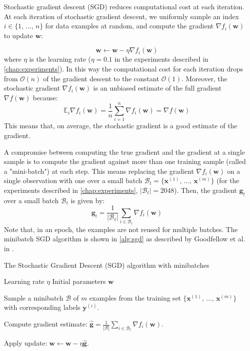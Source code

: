 Stochastic gradient descent (SGD) reduces computational cost at each iteration. At each iteration of stochastic gradient descent, we uniformly sample an index $i \in \{ 1, \, ..., \, n\}$ for data examples at random, and compute the gradient $\nabla f_i (\textbf{w})$ to update $\textbf{w}$:

\begin{equation}
    \textbf{w} \leftarrow \textbf{w} - \eta \nabla f_i(\textbf{w})
\end{equation}
where $\eta$ is the learning rate ($\eta = 0.1$ in the experiments described in \autoref{chap:experiments}). In this way the computational cost for each iteration drops from $\mathcal{O}(n)$ of the gradient descent to the constant $\mathcal{O}(1)$. Moreover, the stochastic gradient $\nabla f_i(\textbf{w})$ is an unbiased estimate of the full gradient $\nabla f(\textbf{w})$ because:
\begin{equation}
    \mathbb{E}_i \nabla f_i(\mathbf{w}) = \frac{1}{n} \sum_{i = 1}^n \nabla f_i(\mathbf{w}) = \nabla f(\mathbf{w})
\end{equation}
This means that, on average, the stochastic gradient is a good estimate of the gradient.

A compromise between computing the true gradient and the gradient at a single sample is to compute the gradient against more than one training sample (called a "mini-batch") at each step. This means replacing the gradient $\nabla f_i(\textbf{w})$ on a single observation with one over a small batch $\mathcal{B}_t = \{ \textbf{x}^{(1)},\, ..., \, \textbf{x}^{(m)}\}$ (for the experiments described in \autoref{chap:experiments}, $|\mathcal{B}_t| = 2048$). Then, the gradient $\textbf{g}_t$ over a small batch $\mathcal{B}_t$ is given by:
\begin{equation}
    \mathbf{g}_t = \frac{1}{|\mathcal{B}_t|} \sum_{i \in \mathcal{B}_t} \nabla f_i(\mathbf{w})
\end{equation}
Note that, in an epoch, the examples are not reused for multiple batches. The minibatch SGD algorithm is shown in \autoref{alg:sgd} as described by Goodfellow et al. in \cite{Goodfellow-et-al-2016}.


\begin{algorithm}
    \caption{The Stochastic Gradient Descent (SGD) algorithm with minibatches}\label{alg:sgd}
    \begin{algorithmic}
        \Require Learning rate $\eta$
        \Require Initial parameters $\textbf{w}$
        
        
        Sample a minibatch $\mathcal{B}$ of $m$ examples from the training set $\{ \textbf{x}^{(1)},\, ..., \, \textbf{x}^{(m)}\}$ with corresponding labels $\textbf{y}^{(i)}$.

    Compute gradient estimate: $\hat{\mathbf{g}} = \frac{1}{|\mathcal{B}|} \sum_{i \in \mathcal{B}_t} \nabla f_i(\mathbf{w})$.

    Apply update: $\textbf{w} \leftarrow \textbf{w} - \eta \hat{\mathbf{g}}$.

    \EndWhile
    \end{algorithmic}
    \end{algorithm}


